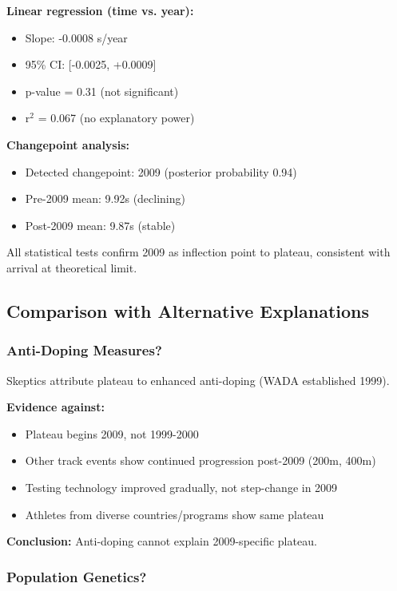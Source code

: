 \documentclass[10pt]{article}
\begin{document}
\textbf{Linear regression (time vs. year):}
\begin{itemize}
\item Slope: -0.0008 s/year
\item 95\% CI: [-0.0025, +0.0009]
\item p-value = 0.31 (not significant)
\item r$^2$ = 0.067 (no explanatory power)
\end{itemize}

\textbf{Changepoint analysis:}
\begin{itemize}
\item Detected changepoint: 2009 (posterior probability 0.94)
\item Pre-2009 mean: 9.92s (declining)
\item Post-2009 mean: 9.87s (stable)
\end{itemize}

All statistical tests confirm 2009 as inflection point to plateau, consistent with arrival at theoretical limit.

\subsection{Comparison with Alternative Explanations}

\subsubsection{Anti-Doping Measures?}

Skeptics attribute plateau to enhanced anti-doping (WADA established 1999).

\textbf{Evidence against:}
\begin{itemize}
\item Plateau begins 2009, not 1999-2000
\item Other track events show continued progression post-2009 (200m, 400m)
\item Testing technology improved gradually, not step-change in 2009
\item Athletes from diverse countries/programs show same plateau
\end{itemize}

\textbf{Conclusion:} Anti-doping cannot explain 2009-specific plateau.

\subsubsection{Population Genetics?}
\end{document}
